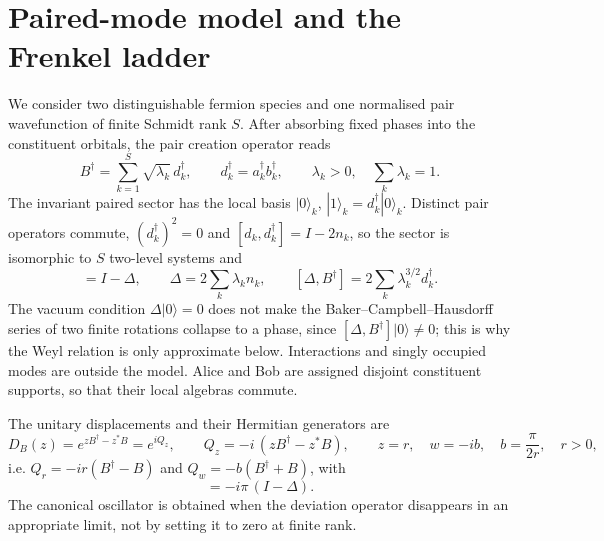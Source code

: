 \documentclass[11pt,a4paper]{article}
\newcommand{\ket}[1]{|#1\rangle}
\begin{document}
\begin{figure}[t]
\label{fig:scheme}
\end{figure}

\section{Paired-mode model and the Frenkel ladder}
\label{sec:model}

We consider two distinguishable fermion species and one normalised pair wavefunction of finite Schmidt rank $S$. After absorbing fixed phases into the constituent orbitals, the pair creation operator reads
\begin{equation}
B^\dagger=\sum_{k=1}^{S}\sqrt{\lambda_k}\,d_k^\dagger,\qquad d_k^\dagger=a_k^\dagger b_k^\dagger,\qquad \lambda_k>0,\quad \sum_k\lambda_k=1.
\label{eq:B}
\end{equation}
The invariant paired sector has the local basis $\ket{0}_k$, $\ket{1}_k=d_k^\dagger\ket{0}_k$. Distinct pair operators commute, $(d_k^\dagger)^2=0$ and $[d_k,d_k^\dagger]=I-2n_k$, so the sector is isomorphic to $S$ two-level systems and
\begin{equation}
[B,B^\dagger]=I-\Delta,\qquad \Delta=2\sum_k\lambda_k n_k,\qquad [\Delta,B^\dagger]=2\sum_k\lambda_k^{3/2}d_k^\dagger .
\label{eq:comm}
\end{equation}
The vacuum condition $\Delta\ket{0}=0$ does not make the Baker--Campbell--Hausdorff series of two finite rotations collapse to a phase, since $[\Delta,B^\dagger]\ket0\neq0$; this is why the Weyl relation is only approximate below. Interactions and singly occupied modes are outside the model. Alice and Bob are assigned disjoint constituent supports, so that their local algebras commute.

The unitary displacements and their Hermitian generators are
\begin{equation}
D_B(z)=e^{zB^\dagger-z^*B}=e^{iQ_z},\qquad Q_z=-i\,(zB^\dagger-z^*B),\qquad z=r,\quad w=-ib,\quad b=\frac{\pi}{2r},\quad r>0,
\label{eq:disp}
\end{equation}
i.e. $Q_r=-ir(B^\dagger-B)$ and $Q_w=-b(B^\dagger+B)$, with
\begin{equation}
[Q_r,Q_w]=-i\pi\,(I-\Delta).
\end{equation}
The canonical oscillator is obtained when the deviation operator disappears in an appropriate limit, not by setting it to zero at finite rank.
\end{document}

